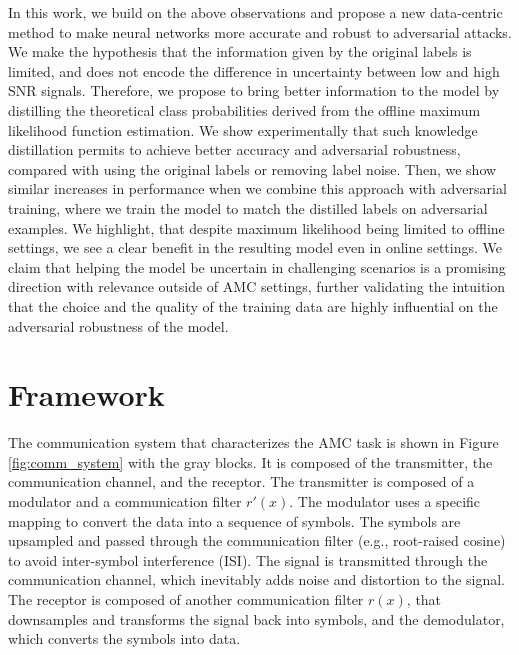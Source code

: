 \documentclass[conference]{IEEEtran}
\newcommand{\pf}[1]{{\textcolor{orange}{PF: {#1}}}}
\begin{document}
In this work, we build on the above observations and propose a new data-centric method to make neural networks more accurate and robust to adversarial attacks. We make the hypothesis that the information given by the original labels is limited, and does not encode the difference in uncertainty between low and high SNR signals. 
Therefore, we propose to bring better information to the model by distilling the theoretical class probabilities derived from the offline maximum likelihood function estimation. 
We show experimentally that such knowledge distillation permits to achieve better accuracy and adversarial robustness, compared with using the original labels or removing label noise. 
Then, we show similar increases in performance when we combine this approach with adversarial training, where we train the model to match the distilled labels on adversarial examples. We highlight, that despite maximum likelihood being limited to offline settings, we see a clear benefit in the resulting model even in online settings. We claim that helping the model be uncertain in challenging scenarios is a promising direction with relevance outside of AMC settings, further validating the intuition that the choice and the quality of the training data are highly influential on the adversarial robustness of the model.


\section{Framework}


The communication system that characterizes the AMC task is shown in Figure \ref{fig:comm_system} with the gray blocks. It is composed of the transmitter, the communication channel, and the receptor. The transmitter is composed of a modulator and a communication filter $r'(x)$. The modulator uses a specific mapping to convert the data into a sequence of symbols. The symbols are upsampled and passed through the communication filter (e.g., root-raised cosine) to avoid inter-symbol interference (ISI). The signal is transmitted through the communication channel, which inevitably adds noise and distortion to the signal. The receptor is composed of another communication filter $r(x)$, that downsamples and transforms the signal back into symbols, and the demodulator, which converts the symbols into data. 
\end{document}
